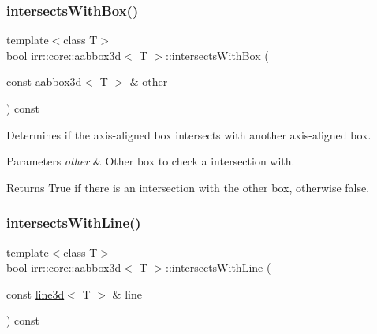 \subsubsection{\texorpdfstring{intersects\+With\+Box()}{intersectsWithBox()}\hspace{0.1cm}{\footnotesize\ttfamily [2/2]}}
{\footnotesize\ttfamily template$<$class T$>$ \\
bool \hyperlink{classirr_1_1core_1_1aabbox3d}{irr\+::core\+::aabbox3d}$<$ T $>$\+::intersects\+With\+Box (\begin{DoxyParamCaption}\item[{const \hyperlink{classirr_1_1core_1_1aabbox3d}{aabbox3d}$<$ T $>$ \&}]{other }\end{DoxyParamCaption}) const\hspace{0.3cm}{\ttfamily [inline]}}



Determines if the axis-\/aligned box intersects with another axis-\/aligned box. 


\begin{DoxyParams}{Parameters}
{\em other} & Other box to check a intersection with. \\
\hline
\end{DoxyParams}
\begin{DoxyReturn}{Returns}
True if there is an intersection with the other box, otherwise false. 
\end{DoxyReturn}
\mbox{\label{classirr_1_1core_1_1aabbox3d_ad0d7fec0145329dfca538066298fa3f2}} 
\subsubsection{\texorpdfstring{intersects\+With\+Line()}{intersectsWithLine()}\hspace{0.1cm}{\footnotesize\ttfamily [1/4]}}
{\footnotesize\ttfamily template$<$class T$>$ \\
bool \hyperlink{classirr_1_1core_1_1aabbox3d}{irr\+::core\+::aabbox3d}$<$ T $>$\+::intersects\+With\+Line (\begin{DoxyParamCaption}\item[{const \hyperlink{classirr_1_1core_1_1line3d}{line3d}$<$ T $>$ \&}]{line }\end{DoxyParamCaption}) const\hspace{0.3cm}{\ttfamily [inline]}}



